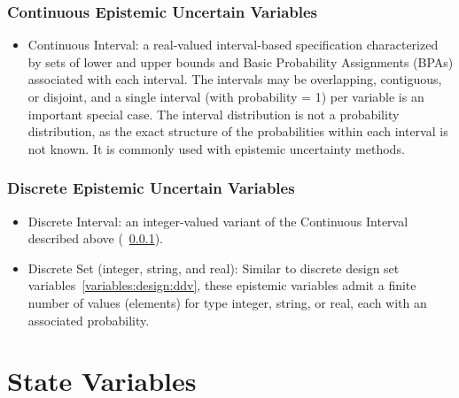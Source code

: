 \subsubsection{Continuous Epistemic Uncertain Variables}\label{variables:uncertain:ceuv}

\begin{itemize}

\item Continuous Interval: a real-valued interval-based specification
  characterized by sets of lower and upper bounds and Basic
  Probability Assignments (BPAs) associated with each interval.  The
  intervals may be overlapping, contiguous, or disjoint, and a single
  interval (with probability = 1) per variable is an important special
  case.  The interval distribution is not a probability distribution,
  as the exact structure of the probabilities within each interval is
  not known.  It is commonly used with epistemic uncertainty methods.

\end{itemize}


\subsubsection{Discrete Epistemic Uncertain Variables}\label{variables:uncertain:deuv}

\begin{itemize}

\item Discrete Interval: an integer-valued variant of the Continuous
  Interval described above (~\ref{variables:uncertain:ceuv}).

\item Discrete Set (integer, string, and real): Similar to discrete
  design set variables~\ref{variables:design:ddv}, these epistemic
  variables admit a finite number of values (elements) for type
  integer, string, or real, each with an associated probability.

\end{itemize}


\section{State Variables}\label{variables:state}

